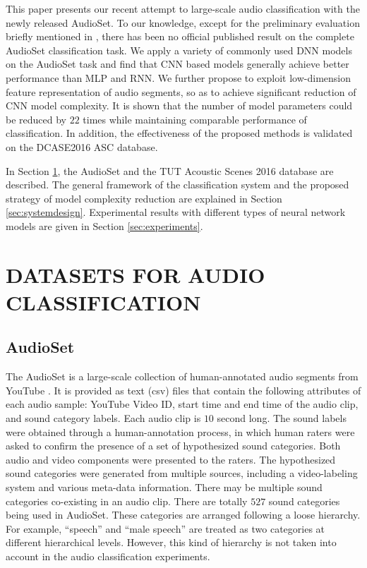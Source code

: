 \documentclass{article}
\begin{document}
This paper presents our recent attempt to large-scale audio classification with the newly released AudioSet. To our knowledge, except for the preliminary evaluation briefly mentioned in \cite{googlecnnaudioclass}, there has been no official published result on the complete AudioSet classification task. We apply a variety of commonly used DNN models on the AudioSet task and find that CNN based models generally achieve better performance than MLP and RNN. We further propose to exploit low-dimension feature representation of audio segments, so as to achieve significant reduction of CNN model complexity. It is shown that the number of model parameters could be reduced by $22$ times while maintaining comparable performance of classification. In addition, the effectiveness of the proposed methods is validated on the DCASE2016 ASC database.

In Section \ref{sec:dataset}, the AudioSet and the TUT Acoustic Scenes 2016 database are described. The general framework of the classification system and the proposed strategy of model complexity reduction are explained in Section \ref{sec:systemdesign}. Experimental results with different types of neural network models are given in Section \ref{sec:experiments}.

\section{DATASETS FOR AUDIO CLASSIFICATION}
\label{sec:dataset}


\subsection{AudioSet}
\label{ssec:audiosetdatabase}

The AudioSet is a large-scale collection of human-annotated audio segments from YouTube \cite{audioset2017ontology}. It is provided as text (csv) files that contain the following attributes of each audio sample: YouTube Video ID, start time and end time of the audio clip, and sound category labels. Each audio clip is $10$ second long. The sound labels were obtained through a human-annotation process, in which human raters were asked to confirm the presence of a set of hypothesized sound categories. Both audio and video components were presented to the raters. The hypothesized sound categories were generated from multiple sources, including a video-labeling system and various meta-data information. There may be multiple sound categories co-existing in an audio clip. There are totally $527$ sound categories being used in AudioSet. These categories are arranged following a loose hierarchy. For example, ``speech'' and ``male speech'' are treated as two categories at different hierarchical levels. However, this kind of hierarchy is not taken into account in the audio classification experiments.
\end{document}
